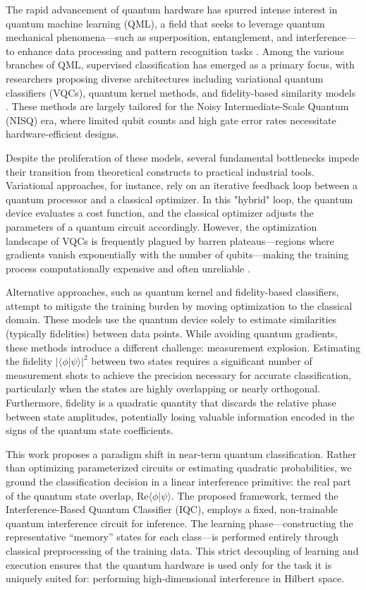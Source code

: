 \documentclass[conference]{IEEEtran}
\begin{document}
The rapid advancement of quantum hardware has spurred intense interest in quantum machine learning (QML), a field that seeks to leverage quantum mechanical phenomena—such as superposition, entanglement, and interference—to enhance data processing and pattern recognition tasks \cite{wang2024review,cerezo2021variational}. Among the various branches of QML, supervised classification has emerged as a primary focus, with researchers proposing diverse architectures including variational quantum classifiers (VQCs), quantum kernel methods, and fidelity-based similarity models \cite{benedetti2019parameterized,abbas2021power,schuld2019feature}. These methods are largely tailored for the Noisy Intermediate-Scale Quantum (NISQ) era, where limited qubit counts and high gate error rates necessitate hardware-efficient designs.

Despite the proliferation of these models, several fundamental bottlenecks impede their transition from theoretical constructs to practical industrial tools. Variational approaches, for instance, rely on an iterative feedback loop between a quantum processor and a classical optimizer. In this "hybrid" loop, the quantum device evaluates a cost function, and the classical optimizer adjusts the parameters of a quantum circuit accordingly. However, the optimization landscape of VQCs is frequently plagued by barren plateaus—regions where gradients vanish exponentially with the number of qubits—making the training process computationally expensive and often unreliable \cite{mcclean2018barren}.

Alternative approaches, such as quantum kernel and fidelity-based classifiers, attempt to mitigate the training burden by moving optimization to the classical domain. These models use the quantum device solely to estimate similarities (typically fidelities) between data points. While avoiding quantum gradients, these methods introduce a different challenge: measurement explosion. Estimating the fidelity $|\langle \phi | \psi \rangle|^2$ between two states requires a significant number of measurement shots to achieve the precision necessary for accurate classification, particularly when the states are highly overlapping or nearly orthogonal. Furthermore, fidelity is a quadratic quantity that discards the relative phase between state amplitudes, potentially losing valuable information encoded in the signs of the quantum state coefficients.

This work proposes a paradigm shift in near-term quantum classification. Rather than optimizing parameterized circuits or estimating quadratic probabilities, we ground the classification decision in a linear interference primitive: the real part of the quantum state overlap, $\mathrm{Re}\langle \phi | \psi \rangle$. The proposed framework, termed the Interference-Based Quantum Classifier (IQC), employs a fixed, non-trainable quantum interference circuit for inference. The learning phase---constructing the representative ``memory'' states for each class---is performed entirely through classical preprocessing of the training data. This strict decoupling of learning and execution ensures that the quantum hardware is used only for the task it is uniquely suited for: performing high-dimensional interference in Hilbert space.
\end{document}
